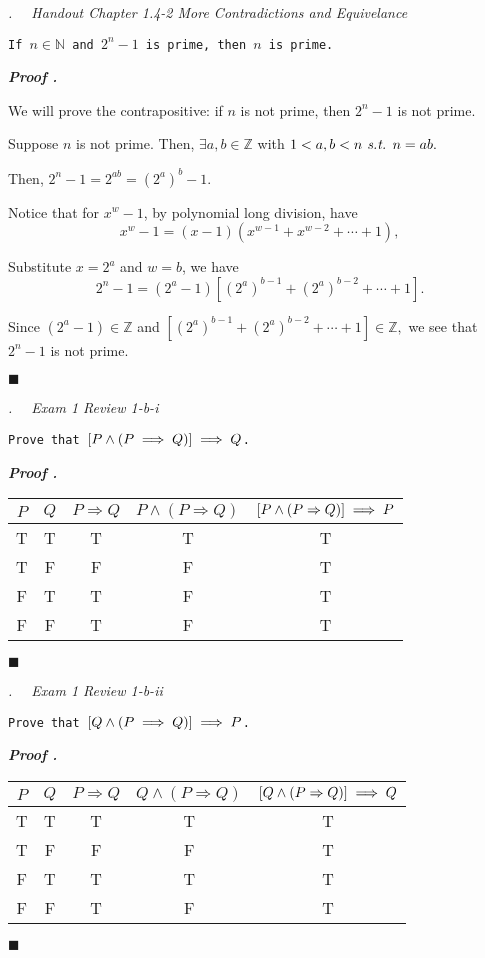 \documentclass[10pt,letter]{article}
\newcounter{nq}[section]
\newcounter{np}[section]
\newenvironment*{p}{\par\noindent\textbf{\textit{Proof \stepcounter{np}\thenp. }}\par}{\par\hfill $\blacksquare$\par}
\newenvironment*{q}[1]{\noindent\emph{\thesection.\stepcounter{nq}\thenq$\quad $ #1}\par\noindent\texttt}{}
\def\Z{{\mathbb{Z}}}
\def\N{{\mathbb{N}}}
\def\st{\emph{ s.t. }}
\begin{document}
\begin{framed}\begin{q}
	{Handout Chapter 1.4-2 More Contradictions and Equivelance}
	{If $n\in\N$ and $2^n-1$ is prime, then $n$ is prime.}
\end{q}\end{framed}
\begin{p}
	We will prove the contrapositive: if $n$ is not prime, then $2^n-1$ is not prime.\par Suppose $n$ is not prime. Then, $\exists a,b\in\Z$ with $1<a,b<n\st n=ab.$\par Then, $2^n-1=2^{ab}=\left(2^a\right)^b-1.$\par Notice that for $x^w-1$, by polynomial long division, have \[x^w-1=(x-1)\left(x^{w-1}+x^{w-2}+\cdots+1\right),\]\par Substitute $x=2^a$ and $w=b$, we have \[2^n-1=\left(2^a-1\right)\left[\left(2^a\right)^{b-1}+\left(2^a\right)^{b-2}+\cdots+1\right].\]\par Since $\left(2^a-1\right)\in\Z$ and $\left[\left(2^a\right)^{b-1}+\left(2^a\right)^{b-2}+\cdots+1\right]\in\Z,$ we see that $2^n-1$ is not prime. 
\end{p}

\begin{framed}\begin{q}
	{Exam 1 Review 1-b-i}
	{Prove that $\qty[P\wedge\qty(P\implies Q)]\implies Q$.}
\end{q}\end{framed}
\hspace*{\fill}\newline
\hspace*{\fill}
\begin{p}
	\begin{center}\begin{tabular}{c|c|c|c|c}
		$P$&$Q$&$P\Rightarrow Q$&$P\wedge(P\Rightarrow Q)$&$\qty[P\wedge(P\Rightarrow Q)]\implies P$\\
		\hline
		T&T&T&T&T\\
		T&F&F&F&T\\
		F&T&T&F&T\\
		F&F&T&F&T
	\end{tabular}\end{center}
\end{p}

\begin{framed}\begin{q}
	{Exam 1 Review 1-b-ii}
	{Prove that $\qty[Q\wedge\qty(P\implies Q)]\implies P$.}
\end{q}\end{framed}
\begin{p}
	\begin{center}\begin{tabular}{c|c|c|c|c}
		$P$&$Q$&$P\Rightarrow Q$&$Q\wedge(P\Rightarrow Q)$&$\qty[Q\wedge(P\Rightarrow Q)]\implies Q$\\
		\hline
		T&T&T&T&T\\
		T&F&F&F&T\\
		F&T&T&T&T\\
		F&F&T&F&T
	\end{tabular}\end{center}
\end{p}
\end{document}
